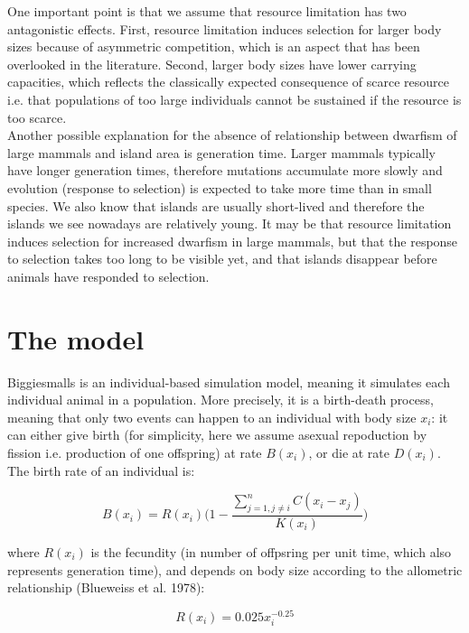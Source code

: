 \documentclass[12pt]{article}
\begin{document}
One important point is that we assume that resource limitation has two antagonistic effects. First, resource limitation induces selection for larger body sizes because of asymmetric competition, which is an aspect that has been overlooked in the literature. Second, larger body sizes have lower carrying capacities, which reflects the classically expected consequence of scarce resource i.e. that populations of too large individuals cannot be sustained if the resource is too scarce.\\

Another possible explanation for the absence of relationship between dwarfism of large mammals and island area is generation time. Larger mammals typically have longer generation times, therefore mutations accumulate more slowly and evolution (response to selection) is expected to take more time than in small species. We also know that islands are usually short-lived and therefore the islands we see nowadays are relatively young. It may be that resource limitation induces selection for increased dwarfism in large mammals, but that the response to selection takes too long to be visible yet, and that islands disappear before animals have responded to selection.\\



\section{The model}

Biggiesmalls is an individual-based simulation model, meaning it simulates each individual animal in a population. More precisely, it is a birth-death process, meaning that only two events can happen to an individual with body size $x_i$: it can either give birth (for simplicity, here we assume asexual repoduction by fission i.e. production of one offspring) at rate $B(x_i)$, or die at rate $D(x_i)$.\\

The birth rate of an individual is:

\[
B(x_i) = R(x_i) \Bigg(1 - \frac{\sum_{j = 1, j \neq i}^{n} C(x_i - x_j)}{K(x_i)} \Bigg)
\]

where $R(x_i)$ is the fecundity (in number of offpsring per unit time, which also represents generation time), and depends on body size according to the allometric relationship (Blueweiss et al. 1978):

\[
R(x_i) = 0.025 x_i^{-0.25}
\]
\end{document}
